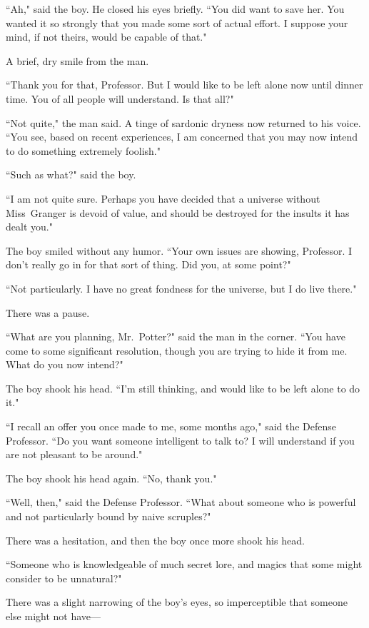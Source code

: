 ``Ah," said the boy. He closed his eyes briefly. ``You did want to save her. You wanted it so strongly that you made some sort of actual effort. I suppose your mind, if not theirs, would be capable of that."

A brief, dry smile from the man.

``Thank you for that, Professor. But I would like to be left alone now until dinner time. You of all people will understand. Is that all?"

``Not quite," the man said. A tinge of sardonic dryness now returned to his voice. ``You see, based on recent experiences, I am concerned that you may now intend to do something extremely foolish."

``Such as what?" said the boy.

``I am not quite sure. Perhaps you have decided that a universe without Miss~Granger is devoid of value, and should be destroyed for the insults it has dealt you."

The boy smiled without any humor. ``Your own issues are showing, Professor. I don't really go in for that sort of thing. Did you, at some point?"

``Not particularly. I have no great fondness for the universe, but I do live there."

There was a pause.

``What are you planning, Mr.~Potter?" said the man in the corner. ``You have come to some significant resolution, though you are trying to hide it from me. What do you now intend?"

The boy shook his head. ``I'm still thinking, and would like to be left alone to do it."

``I recall an offer you once made to me, some months ago," said the Defense Professor. ``Do you want someone intelligent to talk to? I will understand if you are not pleasant to be around."

The boy shook his head again. ``No, thank you."

``Well, then," said the Defense Professor. ``What about someone who is powerful and not particularly bound by naive scruples?"

There was a hesitation, and then the boy once more shook his head.

``Someone who is knowledgeable of much secret lore, and magics that some might consider to be unnatural?"

There was a slight narrowing of the boy's eyes, so imperceptible that someone else might not have---

